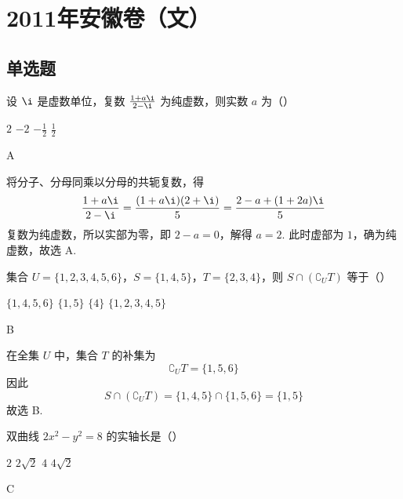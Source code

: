 \chapter{2011年安徽卷（文）}

\section{单选题}

\begin{problem}
设 \(\i\) 是虚数单位，复数 \(\frac{1 + a\i}{2 - \i}\) 为纯虚数，则实数 \(a\) 为（\quad）

\choices
    {\(2\)}
    {\(-2\)}
    {\(-\frac{1}{2}\)}
    {\(\frac{1}{2}\)}
\end{problem}

\begin{answer}
A
\end{answer}

\begin{solution}
将分子、分母同乘以分母的共轭复数，得
\[
\frac{1+a\i}{2-\i}=\frac{(1+a\i)(2+\i)}{5}=\frac{2-a+(1+2a)\i}{5}
\]
复数为纯虚数，所以实部为零，即 \(2-a=0\)，解得 \(a=2\). 此时虚部为 \(1\)，确为纯虚数，故选 A.
\end{solution}

\begin{problem}
集合 \(U = \{1, 2, 3, 4, 5, 6\}\)，\(S = \{1, 4, 5\}\)，\(T = \{2, 3, 4\}\)，则 \(S \cap \left(\complement_{U} T\right)\) 等于（\quad）

\choices
    {\(\{1, 4, 5, 6\}\)}
    {\(\{1, 5\}\)}
    {\(\{4\}\)}
    {\(\{1, 2, 3, 4, 5\}\)}
\end{problem}

\begin{answer}
B
\end{answer}

\begin{solution}
在全集 \(U\) 中，集合 \(T\) 的补集为
\[
\complement_U T=\{1,5,6\}
\]
因此
\[
S\cap\left(\complement_U T\right)=\{1,4,5\}\cap\{1,5,6\}=\{1,5\}
\]
故选 B.
\end{solution}

\begin{problem}
双曲线 \(2x^{2} - y^{2} = 8\) 的实轴长是（\quad）

\choices
    {\(2\)}
    {\(2\sqrt{2}\)}
    {\(4\)}
    {\(4\sqrt{2}\)}
\end{problem}

\begin{answer}
C
\end{answer}

